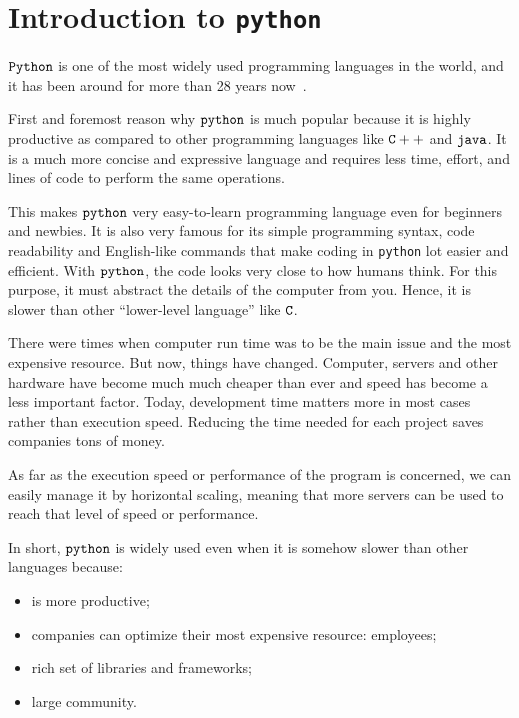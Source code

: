 \chapter{Introduction to \texttt{python}}\label{introduction-to-python---lesson-1}

$\tt{Python}$ is one of the most widely used programming languages in the world, and it has been around for more than 28 years now~\cite{survey2019}.

First and foremost reason why $\tt{python}$ is much popular because it is highly productive as compared to other programming languages like $\tt{C++}$ and $\tt{java}$. It is a much more concise and expressive language and requires less time, effort, and lines of code to perform the same operations.

This makes $\tt{python}$ very easy-to-learn programming language even for beginners and newbies. It is also very famous for its simple programming syntax, code readability and English-like commands that make coding in \texttt{python} lot easier and efficient.
With $\tt{python}$, the code looks very close to how humans think. For this purpose, it must abstract the details of the computer from you. Hence, it is slower than other “lower-level language” like $\tt{C}$.

There were times when computer run time was to be the main issue and the most expensive resource. But now, things have changed. Computer, servers and other hardware have become much much cheaper than ever and speed has become a less important factor. Today, development time matters more in most cases rather than execution speed. Reducing the time needed for each project saves companies tons of money.

As far as the execution speed or performance of the program is concerned, we can easily manage it by horizontal scaling, meaning that more servers can be used to reach that level of speed or performance.

In short, $\tt{python}$ is widely used even when it is somehow slower than other languages because:
\begin{itemize}
  \item is more productive;
  \item companies can optimize their most expensive resource: employees;
  \item rich set of libraries and frameworks;
  \item large community.
\end{itemize}


